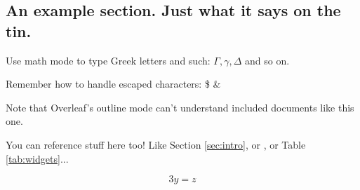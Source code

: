 \subsection{An example section. Just what it says on the tin.}
Use math mode to type Greek letters and such: $\Gamma, \gamma, \Delta$ and so on.

Remember how to handle escaped characters:
\$
\&

Note that Overleaf's outline mode can't understand included documents like this one.

You can reference stuff here too! Like Section \ref{sec:intro}, or \cite{NIKAM20082743}, or Table \ref{tab:widgets}...

\begin{equation}
    \label{eqn:included-eqn}
    3y = z
\end{equation}